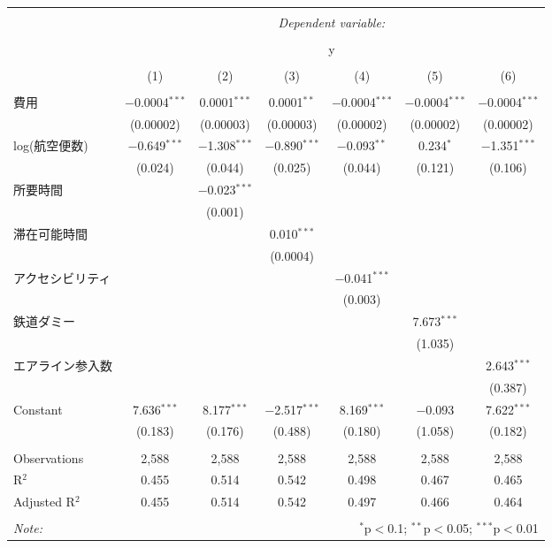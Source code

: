 \documentclass{jsarticle}
\begin{document}
\begin{table}[!htbp] \centering 
  \caption{} 
  \label{} 
\begin{tabular}{@{\extracolsep{5pt}}lcccccc} 
\\[-1.8ex]\hline 
\hline \\[-1.8ex] 
 & \multicolumn{6}{c}{\textit{Dependent variable:}} \\ 
\cline{2-7} 
\\[-1.8ex] & \multicolumn{6}{c}{y} \\ 
\\[-1.8ex] & (1) & (2) & (3) & (4) & (5) & (6)\\ 
\hline \\[-1.8ex] 
 費用 & $-$0.0004$^{***}$ & 0.0001$^{***}$ & 0.0001$^{**}$ & $-$0.0004$^{***}$ & $-$0.0004$^{***}$ & $-$0.0004$^{***}$ \\ 
  & (0.00002) & (0.00003) & (0.00003) & (0.00002) & (0.00002) & (0.00002) \\ 
  log(航空便数) & $-$0.649$^{***}$ & $-$1.308$^{***}$ & $-$0.890$^{***}$ & $-$0.093$^{**}$ & 0.234$^{*}$ & $-$1.351$^{***}$ \\ 
  & (0.024) & (0.044) & (0.025) & (0.044) & (0.121) & (0.106) \\ 
  所要時間 &  & $-$0.023$^{***}$ &  &  &  &  \\ 
  &  & (0.001) &  &  &  &  \\ 
  滞在可能時間 &  &  & 0.010$^{***}$ &  &  &  \\ 
  &  &  & (0.0004) &  &  &  \\ 
  アクセシビリティ &  &  &  & $-$0.041$^{***}$ &  &  \\ 
  &  &  &  & (0.003) &  &  \\ 
  鉄道ダミー &  &  &  &  & 7.673$^{***}$ &  \\ 
  &  &  &  &  & (1.035) &  \\ 
  エアライン参入数 &  &  &  &  &  & 2.643$^{***}$ \\ 
  &  &  &  &  &  & (0.387) \\ 
  Constant & 7.636$^{***}$ & 8.177$^{***}$ & $-$2.517$^{***}$ & 8.169$^{***}$ & $-$0.093 & 7.622$^{***}$ \\ 
  & (0.183) & (0.176) & (0.488) & (0.180) & (1.058) & (0.182) \\ 
 \hline \\[-1.8ex] 
Observations & 2,588 & 2,588 & 2,588 & 2,588 & 2,588 & 2,588 \\ 
R$^{2}$ & 0.455 & 0.514 & 0.542 & 0.498 & 0.467 & 0.465 \\ 
Adjusted R$^{2}$ & 0.455 & 0.514 & 0.542 & 0.497 & 0.466 & 0.464 \\ 
\hline 
\hline \\[-1.8ex] 
\textit{Note:}  & \multicolumn{6}{r}{$^{*}$p$<$0.1; $^{**}$p$<$0.05; $^{***}$p$<$0.01} \\ 
\end{tabular} 
\end{table}
\end{document}

